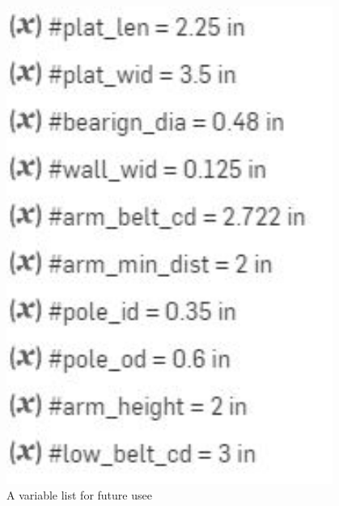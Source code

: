 \begin{figure}[ht]
\centering
\begin{minipage}[b]{.48\textwidth}
  \centering
  \includegraphics[width=0.95\textwidth]{Meetings/November/11-18-21/11-18-21_CAD_Figure1 - Nathan Forrer.JPG}
  \caption{A variable list for future usee}
  \label{fig:111821_1}
\end{minipage}%
\hfill%
\begin{minipage}[b]{.48\textwidth}
  \centering

\end{minipage}
\end{figure}
